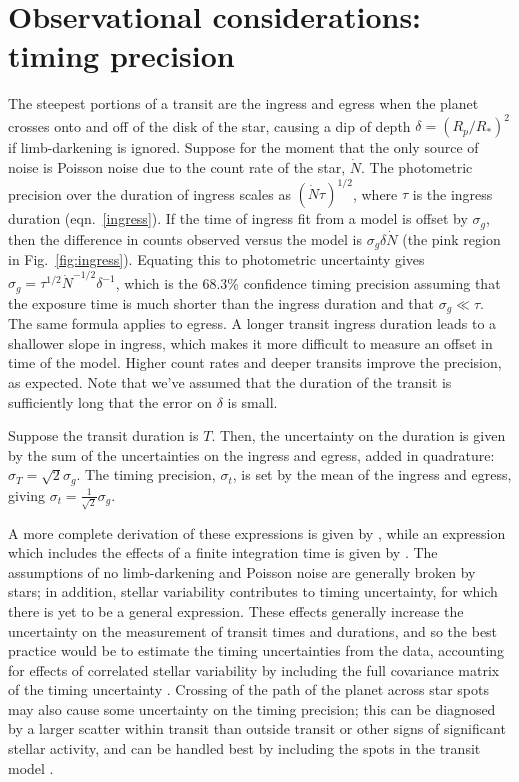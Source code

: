 \documentclass[graybox,natbib,nosecnum]{svmult}
\begin{document}
\section{Observational considerations: timing precision} %

The steepest portions of a transit are the ingress and egress when the planet crosses onto and
off of the disk of the star, causing a dip of depth $\delta = (R_p/R_*)^2$ if limb-darkening is ignored.   
Suppose for the moment that the only source of noise is Poisson noise due to the count rate of 
the star, $\dot N$.  The photometric precision over the duration of ingress scales as
$(\dot N \tau)^{1/2}$, where $\tau$ is the ingress duration (eqn.\ \ref{ingress}).  If the time of 
ingress fit from a model is offset by $\sigma_g$, then the difference in counts observed
versus the model is $\sigma_g \delta \dot N$ (the pink region in Fig.\ \ref{fig:ingress}).  Equating 
this to photometric uncertainty gives $\sigma_g = \tau^{1/2} \dot N^{-1/2} \delta^{-1}$, which
is the 68.3\% confidence timing precision assuming that the exposure time is much shorter than the
ingress duration and that $\sigma_g \ll \tau$.  The same formula applies to egress. A longer transit 
ingress duration leads to a shallower slope in ingress, which makes it more difficult to measure an 
offset in time of the model.  Higher count rates and deeper transits improve the precision, as 
expected.  Note that we've assumed that the duration of the transit is sufficiently long that the 
error on $\delta$ is small.

Suppose the transit duration is $T$.  Then, the uncertainty on the duration is given by
the sum of the uncertainties on the ingress and egress, added in quadrature:
$\sigma_T = \sqrt{2} \sigma_g$.  The timing precision, $\sigma_t$, is set by the mean of the ingress
and egress, giving $\sigma_t = \frac{1}{\sqrt{2}} \sigma_g$.

A more complete derivation of these expressions is given by \citet{2008ApJ...689..499C}, while an 
expression which includes the effects of a finite integration time is given by \citet{2014ApJ...794...92P}.
The assumptions of no limb-darkening and Poisson noise are generally broken by stars;  in addition,
stellar variability contributes to timing uncertainty, for which there is yet to be a general
expression.  These effects generally increase the uncertainty on the measurement of transit times
and durations, and so the best practice would be to estimate the timing uncertainties from the
data, accounting for effects of correlated stellar variability by including the full covariance
matrix of the timing uncertainty \citep{2009ApJ...704...51C,2012MNRAS.419.2683G}.  Crossing of
the path of the planet across star spots may also cause some uncertainty on the timing precision;
this can be diagnosed by a larger scatter within transit than outside transit or other signs of
significant stellar activity, and can be handled best by including the spots in the transit model 
\citep{2016A&A...585A..72I}.
\end{document}
